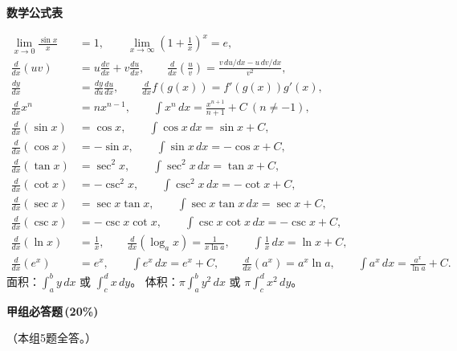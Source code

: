 \documentclass[12pt,a4paper]{exam-zh}
\newcommand{\formulasection}[1]{\vspace{0.6em}{\bfseries #1}\par}
\begin{document}
\begin{center}{\bfseries 数学公式表}\end{center}
\formulasection{V. 微积分}
\begin{align*}
\lim_{x\to0}\frac{\sin x}{x}&=1, \qquad \lim_{x\to\infty}\left(1+\frac1x\right)^x=e, \\
\frac{d}{dx}(uv)&=u\frac{dv}{dx}+v\frac{du}{dx},\qquad \frac{d}{dx}\left(\frac uv\right)=\frac{v\,du/dx-u\,dv/dx}{v^2}, \\
\frac{dy}{dx}&=\frac{dy}{du}\frac{du}{dx},\qquad \frac{d}{dx}f(g(x))=f'(g(x))g'(x), \\
\frac{d}{dx}x^n&=nx^{n-1},\qquad \int x^n\,dx=\frac{x^{n+1}}{n+1}+C\ (n\ne -1), \\
\frac{d}{dx}(\sin x)&=\cos x,\qquad \int \cos x\,dx=\sin x+C, \\
\frac{d}{dx}(\cos x)&=-\sin x,\qquad \int \sin x\,dx=-\cos x+C, \\
\frac{d}{dx}(\tan x)&=\sec^2x,\qquad \int \sec^2x\,dx=\tan x+C, \\
\frac{d}{dx}(\cot x)&=-\csc^2x,\qquad \int \csc^2x\,dx=-\cot x+C, \\
\frac{d}{dx}(\sec x)&=\sec x\tan x,\qquad \int \sec x\tan x\,dx=\sec x+C, \\
\frac{d}{dx}(\csc x)&=-\csc x\cot x,\qquad \int \csc x\cot x\,dx=-\csc x+C, \\
\frac{d}{dx}(\ln x)&=\frac1x,\qquad \frac{d}{dx}(\log_a x)=\frac{1}{x\ln a},\qquad \int \frac{1}{x}\,dx=\ln x+C, \\
\frac{d}{dx}(e^x)&=e^x,\qquad \int e^x\,dx=e^x+C,\qquad \frac{d}{dx}(a^x)=a^x\ln a,\qquad \int a^x\,dx=\frac{a^x}{\ln a}+C.
\end{align*}
面积：$\displaystyle \int_a^b y\,dx$ 或 $\displaystyle \int_c^d x\,dy$。\qquad
体积：$\displaystyle \pi\int_a^b y^2\,dx$ 或 $\displaystyle \pi\int_c^d x^2\,dy$。

\newpage

{\bfseries 甲组\quad 必答题\,(20\%)}\par
（本组5题全答。）
\end{document}
